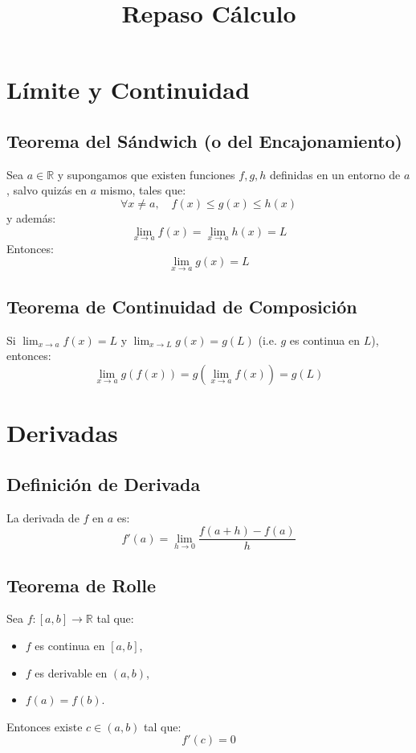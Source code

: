 \documentclass[12pt]{article}
\title{Repaso Cálculo}
\date{}
\begin{document}
\maketitle

\newpage

\tableofcontents

\newpage

\section{Límite y Continuidad}

\subsection{Teorema del Sándwich (o del Encajonamiento)}
Sea $a \in \mathbb{R}$ y supongamos que existen funciones $f, g, h$ definidas en un entorno de $a$, salvo quizás en $a$ mismo, tales que:
\[
\forall x \neq a,\quad f(x) \leq g(x) \leq h(x)
\]
y además:
\[
\lim_{x \to a} f(x) = \lim_{x \to a} h(x) = L
\]
Entonces:
\[
\lim_{x \to a} g(x) = L
\]

\subsection{Teorema de Continuidad de Composición}
Si $\lim_{x \to a} f(x) = L$ y $\lim_{x \to L} g(x) = g(L)$ (i.e. $g$ es continua en $L$), entonces:
\[
\lim_{x \to a} g(f(x)) = g\left( \lim_{x \to a} f(x) \right) = g(L)
\]

\section{Derivadas}

\subsection{Definición de Derivada}
La derivada de $f$ en $a$ es:
\[
f'(a) = \lim_{h \to 0} \frac{f(a+h) - f(a)}{h}
\]

\subsection{Teorema de Rolle}
Sea $f: [a,b] \to \mathbb{R}$ tal que:
\begin{itemize}
  \item $f$ es continua en $[a,b]$,
  \item $f$ es derivable en $(a,b)$,
  \item $f(a) = f(b)$.
\end{itemize}
Entonces existe $c \in (a,b)$ tal que:
\[
f'(c) = 0
\]
\end{document}
